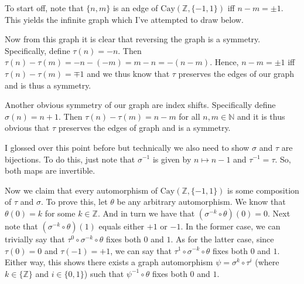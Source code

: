 \documentclass{book}
\newcommand{\HexOne}{%
   \color{Purple}%
   \fontsize{12}{13}\selectfont%
}
\newcommand{\HexPPP}{%
   \color{VioletRed}%
   \fontsize{11}{12}\selectfont%
}
\newenvironment{myIndent}{%
   \begin{adjustwidth}{2.5em}{0em}%
}{%
   \end{adjustwidth}%
}
\newenvironment{myDindent}{%
   \begin{adjustwidth}{5em}{0em}%
}{%
   \end{adjustwidth}%
}
\newcommand{\Cay}{\ensuremath{\mathrm{Cay}}}
\newcommand{\retTwo}{\hfill\bigbreak}
\begin{document}
\begin{myIndent}\HexOne
	To start off, note that $\{n, m\}$ is an edge of $\Cay(\mathbb{Z}, \{-1, 1\})$ iff $n - m = \pm 1$. This yields the infinite graph which I've attempted to draw below.\retTwo

	{\retTwo\par}

	Now from this graph it is clear that reversing the graph is a symmetry. Specifically, define $\tau(n) = -n$. Then $\tau(n) - \tau(m) = -n - (-m) = m-n = -(n-m)$. Hence, $n-m =\pm 1$ iff $\tau(n) - \tau(m) = \mp 1$ and we thus know that $\tau$ preserves the edges of our graph and is thus a symmetry.\retTwo

	Another obvious symmetry of our graph are index shifts. Specifically define $\sigma(n) = n + 1$. Then $\tau(n) - \tau(m) = n - m$ for all $n, m \in \mathbb{N}$ and it is thus obvious that $\tau$ preserves the edges of graph and is a symmetry.

	\begin{myDindent}\HexPPP
		I glossed over this point before but technically we also need to show $\sigma$ and $\tau$ are\\ bijections. To do this, just note that $\sigma^{-1}$ is given by $n \mapsto n-1$ and $\tau^{-1} = \tau$. So,\\ both maps are invertible.\retTwo
	\end{myDindent}

	Now we claim that every automorphism of $\Cay(\mathbb{Z}, \{-1, 1\})$ is some composition of $\tau$ and $\sigma$. To prove this, let $\theta$ be any arbitrary automorphism. We know that $\theta(0) = k$ for some $k \in \mathbb{Z}$. And in turn we have that $(\sigma^{-k} \circ \theta)(0) = 0$. Next note that $(\sigma^{-k} \circ \theta)(1)$ equals either $+1$ or $-1$. In the former case, we can trivially say that $\tau^0 \circ \sigma^{-k} \circ \theta$ fixes both $0$ and $1$. As for the latter case, since $\tau(0) = 0$ and $\tau(-1) = +1$, we can say that $\tau^{1} \circ \sigma^{-k} \circ \theta$ fixes both $0$ and $1$. Either way, this shows there exists a graph automorphism $\psi = \sigma^k \circ \tau^i$ (where $k \in \{\mathbb{Z}\}$ and $i \in \{0, 1\}$) such that $\psi^{-1} \circ \theta$ fixes both $0$ and $1$.\retTwo


\end{myIndent}
\end{document}
